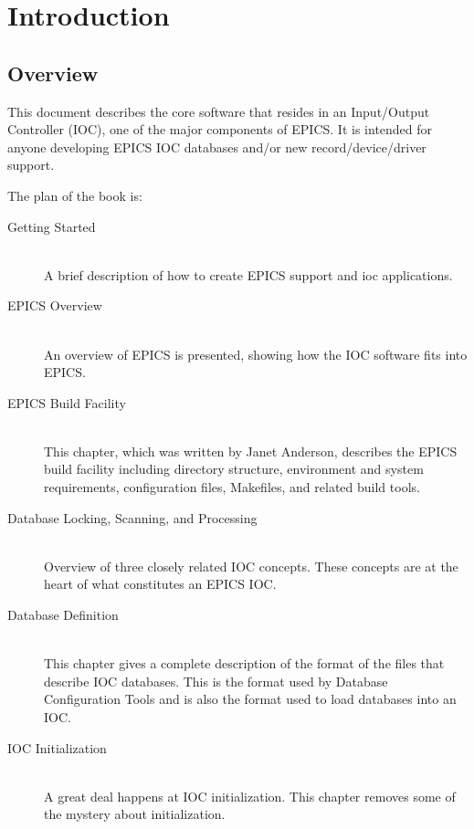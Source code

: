 \chapter{Introduction}

\section{Overview}

This document describes the core software that resides in an Input/Output Controller (IOC), one of the major components 
of EPICS. It is intended for anyone developing EPICS IOC databases and/or new record/device/driver support.

The plan of the book is:

\begin{description} %

\item[Getting Started] \hfill \\
A brief description of how to create EPICS support and ioc applications.

\item[EPICS Overview]  \hfill \\
An overview of EPICS is presented, showing how the IOC software fits into EPICS.

\item[EPICS Build Facility] \hfill \\
This chapter, which was written by Janet Anderson, describes the EPICS build facility including directory 
structure, environment and system requirements, configuration files, Makefiles, and related build tools.

\item[Database Locking, Scanning, and Processing] \hfill \\
Overview of three closely related IOC concepts. These concepts are at the heart of what constitutes an EPICS IOC.

\item[Database Definition] \hfill \\
This chapter gives a complete description of the format of the files that describe IOC databases. This is the format 
used by Database Configuration Tools and is also the format used to load databases into an IOC.

\item[IOC Initialization] \hfill \\
A great deal happens at IOC initialization. This chapter removes some of the mystery about initialization.


\end{description}
